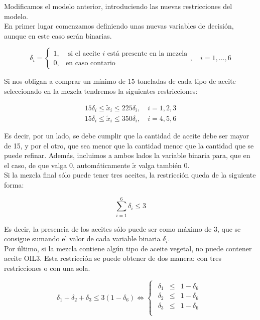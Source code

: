 \documentclass[12pt,a4paper,twoside,openright,titlepage,final]{article}
\begin{document}
Modificamos el modelo anterior, introduciendo las nuevas restricciones del modelo.\\

En primer lugar comenzamos definiendo unas nuevas variables de decisión, aunque en este caso serán binarias.

\[ \delta_i = \begin{cases}
1, & \text{ si el aceite } i \text{ está presente en la mezcla}\\
0, & \text{en caso contario}
\end{cases}, \quad i = 1,\dots,6 \]

Si nos obligan a comprar un mínimo de 15 toneladas de cada tipo de aceite seleccionado en la mezcla tendremos la siguientes restricciones:

\begin{align*}
15\delta_i \leq \tilde{x}_i \leq 225\delta_i, \quad i =1,2,3\\
15\delta_i \leq \tilde{x}_i \leq 350\delta_i, \quad i =4,5,6
\end{align*}

Es decir, por un lado, se debe cumplir que la cantidad de aceite debe ser mayor de 15, y por el otro, que sea menor que la cantidad menor que la cantidad que se puede refinar. Además, incluimos a ambos lados la variable binaria para, que en el caso, de que valga 0, automáticamente $\tilde{x}$ valga también 0.\\

Si la mezcla final sólo puede tener tres aceites, la restricción queda de la siguiente forma:

\[ \sum_{i=1}^{6} \delta_i \leq 3 \]

Es decir, la presencia de los aceites sólo puede ser como máximo de 3, que se consigue sumando el valor de cada variable binaria $\delta_i$.\\

Por último, si la mezcla contiene algún tipo de aceite vegetal, no puede contener aceite OIL3. Esta restricción se puede obtener de dos manera: con tres restricciones o con una sola.

\[ \delta_1 + \delta_2 + \delta_3 \leq 3(1-\delta_6) \iff \begin{cases}
\begin{array}{ccc}
\delta_1 & \leq & 1-\delta_6 \\
\delta_2 & \leq & 1-\delta_6 \\
\delta_3 & \leq & 1-\delta_6 \\
\end{array}
\end{cases} \]
\end{document}
